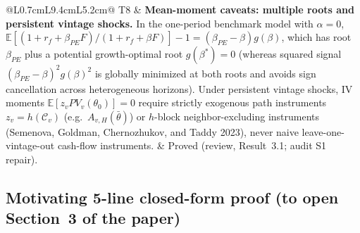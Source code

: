 \documentclass[11pt]{article}
\newcommand{\E}{\mathbb{E}}
\newcommand{\C}{\mathcal{C}}
\begin{document}
{\begin{longtable}{@{}L{0.7cm}L{9.4cm}L{5.2cm}@{}}
T8 & \textbf{Mean-moment caveats: multiple roots and persistent vintage shocks.} In the one-period benchmark model with $\alpha=0$, $\E[(1+r_f+\beta_{PE}F)/(1+r_f+\beta F)]-1=(\beta_{PE}-\beta)g(\beta)$, which has root $\beta_{PE}$ plus a potential growth-optimal root $g(\beta^\ast)=0$ (whereas squared signal $(\beta_{PE}-\beta)^2g(\beta)^2$ is globally minimized at both roots and avoids sign cancellation across heterogeneous horizons). Under persistent vintage shocks, IV moments $\E[z_v PV_v(\theta_0)]=0$ require strictly exogenous path instruments $z_v=h(\C_v)$ (e.g.\ $A_{v,H}(\bar\theta)$) or $h$-block neighbor-excluding instruments (Semenova, Goldman, Chernozhukov, and Taddy 2023), never naive leave-one-vintage-out cash-flow instruments. & Proved (review, Result~3.1; audit S1 repair).\\
\bottomrule
\end{longtable}
}

\subsection{Motivating 5-line closed-form proof (to open Section~3 of the paper)}
\end{document}
